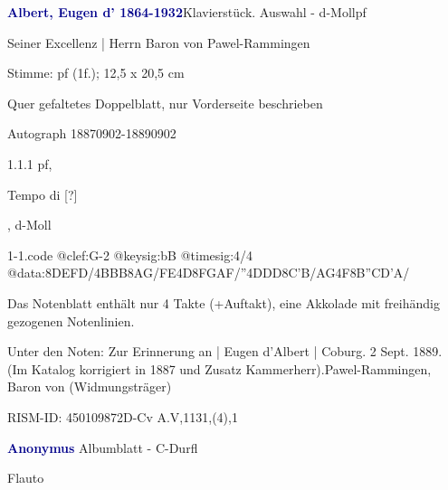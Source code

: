 \documentclass[a4paper, twocolumn, 11pt]{book}
\begin{document}
\par \vspace{16pt} \textcolor{darkblue}{\textbf{Albert, Eugen d'  1864-1932}}\hfillplus{[1]}\newline Klavierstück. Auswahl - d-Moll\newline pf
\par \begin{itshape} Seiner Excellenz | Herrn Baron von Pawel-Rammingen\end{itshape} 
\par \textcolor{darkblue}{}  Stimme: pf  (1f.); 12,5 x 20,5 cm\newline \begin{small} Quer gefaltetes Doppelblatt, nur Vorderseite beschrieben\end{small} \newline Autograph  18870902-18890902
\par 1.1.1  pf, \begin{itshape}Tempo di [?]\end{itshape}, d-Moll  
\begin{filecontents*}{1-1.code}
@clef:G-2
@keysig:bB
@timesig:4/4
@data:{8DEFD}/4BBB{8AG}/{FE}4D8{FGAF}/''4DDD{8C'B}/{AG}4F{8B''CD'A}/
\end{filecontents*}
\newline %
\par Das Notenblatt enthält nur 4 Takte (+Auftakt), eine Akkolade mit freihändig gezogenen Notenlinien.
\par Unter den Noten: {\textquotedbl}Zur Erinnerung an | Eugen d'Albert | Coburg. 2 Sept. 1889.{\textquotedbl} (Im Katalog korrigiert in 1887 und Zusatz {\textquotedbl}Kammerherr{\textquotedbl}).\newline Pawel-Rammingen, Baron von  (Widmungsträger)
\par RISM-ID: 450109872\newline D-Cv  A.V,1131,(4),1
\par \vspace{16pt} \textcolor{darkblue}{\textbf{Anonymus  }}\hfillplus{[2]}\newline Albumblatt - C-Dur\newline fl
\par \begin{itshape}[heading:] Flauto\end{itshape} 
\end{document}
